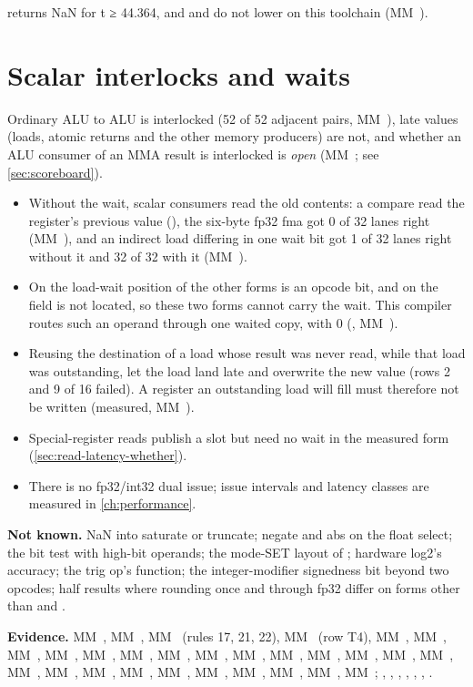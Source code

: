 returns NaN for t ≥ 44.364, and  and  do not lower on this
toolchain (MM~).

\section{Scalar interlocks and waits}\label{sec:dependences-issue-scalar}

Ordinary ALU to ALU is interlocked (52 of 52 adjacent pairs, MM~), late values (loads, atomic returns and
the other memory producers) are not, and whether an ALU consumer of an MMA result is interlocked is \emph{open}
(MM~; see \cref{sec:scoreboard}).

\begin{itemize}
\item Without the wait, scalar consumers read the old contents: a compare read the register's previous value
  (), the six-byte fp32 fma got 0 of 32 lanes right (MM~), and an indirect load differing in
  one wait bit got 1 of 32 lanes right without it and 32 of 32 with it (MM~).
\item On  the load-wait position of the other forms is an opcode bit, and on  the field is not
  located, so these two forms cannot carry the wait. This compiler routes such an operand through one waited copy,  with 0 (, MM~).
\item Reusing the destination of a load whose result was never read, while that load was outstanding, let the load
  land late and overwrite the new value (rows 2 and 9 of 16 failed). A register an outstanding load will fill must
  therefore not be written (measured, MM~).
\item Special-register reads publish a slot but need no wait in the measured form (\cref{sec:read-latency-whether}).
\item There is no fp32/int32 dual issue; issue intervals and latency classes are measured in \cref{ch:performance}.
\end{itemize}

\textbf{Not known.} NaN into saturate or truncate; negate and abs on the float select; the bit test with high-bit operands;
the mode-SET layout of ; hardware log2's accuracy; the trig op's
function; the integer-modifier signedness bit beyond two opcodes; half results where rounding once and through fp32 differ
on forms other than  and .

\textbf{Evidence.} MM~, MM~, MM~ (rules 17, 21, 22), MM~ (row T4), MM~, MM~, MM~, MM~, MM~,
MM~, MM~, MM~, MM~, MM~, MM~, MM~, MM~, MM~, MM~,
MM~, MM~, MM~, MM~, MM~, MM~, MM~, MM~, MM~;
, , , ,
, , .
